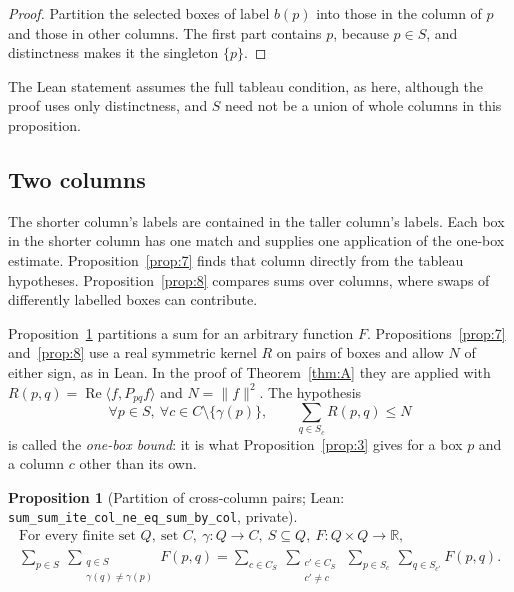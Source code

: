 \documentclass[11pt]{amsart}
\newcommand{\lean}[1]{\texttt{#1}}
\newtheorem{proposition}{Proposition}
\theoremstyle{definition}
\theoremstyle{remark}
\begin{document}
\begin{proof}
Partition the selected boxes of label \(b(p)\) into those in the column of
\(p\) and those in other columns. The first part contains \(p\), because
\(p\in S\), and distinctness makes it the singleton \(\{p\}\).
\end{proof}

The Lean statement assumes the full tableau condition, as here, although the
proof uses only distinctness, and \(S\) need not be a union of whole columns
in this proposition.

\subsection{Two columns}

The shorter column's labels are contained in the taller column's
labels. Each box in the shorter column has one match and supplies one
application of the one-box estimate. Proposition~\ref{prop:7} finds that
column directly from the tableau hypotheses. Proposition~\ref{prop:8}
compares sums over columns, where swaps of differently labelled boxes can
contribute.

Proposition~\ref{prop:6} partitions a sum for an arbitrary function \(F\).
Propositions~\ref{prop:7} and~\ref{prop:8} use a real symmetric kernel \(R\)
on pairs of boxes and allow \(N\) of either sign, as in Lean. In the proof of
Theorem~\ref{thm:A} they are applied with
\(R(p,q)=\operatorname{Re}\langle f,P_{pq}f\rangle\) and \(N=\|f\|^2\). The
hypothesis
\[
\forall p\in S,\ \forall c\in C\setminus\{\gamma(p)\},\qquad
\sum_{q\in S_c}R(p,q)\le N
\]
is called the \emph{one-box bound}: it is what Proposition~\ref{prop:3} gives
for a box \(p\) and a column \(c\) other than its own.

\begin{proposition}[Partition of cross-column pairs; Lean: \lean{sum\_\allowbreak{}sum\_\allowbreak{}ite\_\allowbreak{}col\_\allowbreak{}ne\_\allowbreak{}eq\_\allowbreak{}sum\_\allowbreak{}by\_\allowbreak{}col}, private]\label{prop:6}
\[
\begin{gathered}
\text{For every finite set }Q,\ \text{set }C,\ \gamma:Q\to C,\
S\subseteq Q,\ F:Q\times Q\to\mathbb R,\\
\sum_{p\in S}\ \sum_{\substack{q\in S\\\gamma(q)\ne\gamma(p)}}F(p,q)
=
\sum_{c\in C_S}\ \sum_{\substack{c'\in C_S\\c'\ne c}}
\ \sum_{p\in S_c}\ \sum_{q\in S_{c'}}F(p,q).
\end{gathered}
\]
\end{proposition}
\end{document}
